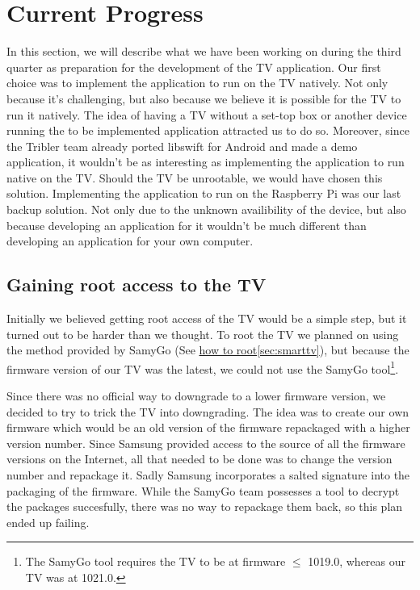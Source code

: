 \chapter{Current Progress}
\label{chap:current}

In this section, we will describe what we have been working on during the third quarter as preparation for the development of the TV application.
Our first choice was to implement the application to run on the TV natively.
Not only because it's challenging, but also because we believe it is possible for the TV to run it natively.
The idea of having a TV without a set-top box or another device running the to be implemented application attracted us to do so.
Moreover, since the Tribler team already ported libswift for Android and made a demo application,
it wouldn't be as interesting as implementing the application to run native on the TV.
Should the TV be unrootable, we would have chosen this solution.
Implementing the application to run on the Raspberry Pi was our last backup solution.
Not only due to the unknown availibility of the device,
but also because developing an application for it wouldn't be much different than developing an application for your own computer.

\section{Gaining root access to the TV}
Initially we believed getting root access of the TV would be a simple step,
but it turned out to be harder than we thought.
To root the TV we planned on using the method provided by SamyGo (See \hyperref[sec:smarttv]{how to root\ref*{sec:smarttv}}),
but because the firmware version of our TV was the latest,
we could not use the SamyGo tool\footnote{The SamyGo tool requires the TV to be at firmware $\le$ 1019.0, whereas our TV was at 1021.0.}.

Since there was no official way to downgrade to a lower firmware version,
we decided to try to trick the TV into downgrading.
The idea was to create our own firmware which would be an old version of the firmware repackaged with a higher version number.
Since Samsung provided access to the source of all the firmware versions on the Internet,
all that needed to be done was to change the version number and repackage it.
Sadly Samsung incorporates a salted signature into the packaging of the firmware.
While the SamyGo team possesses a tool to decrypt the packages succesfully,
there was no way to repackage them back, so this plan ended up failing.

